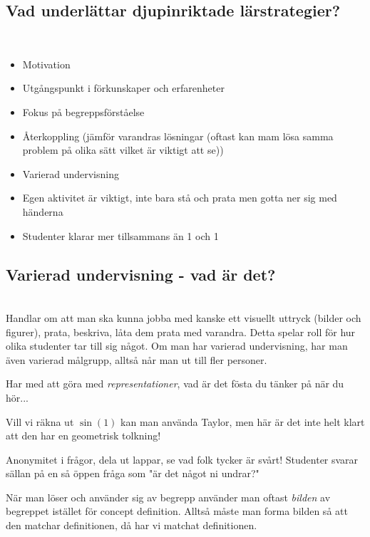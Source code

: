 \subsection{Vad underlättar djupinriktade lärstrategier?}\hfill\\

\begin{itemize}
  \item Motivation
  \item Utgångspunkt i förkunskaper och erfarenheter
  \item Fokus på begreppsförståelse
  \item Återkoppling (jämför varandras lösningar (oftast kan mam lösa samma problem på olika sätt vilket är viktigt att se))
  \item Varierad undervisning
  \item Egen aktivitet är viktigt, inte bara stå och prata men gotta ner sig med händerna
  \item Studenter klarar mer tillsammans än 1 och 1
\end{itemize}

\subsection{Varierad undervisning - vad är det?}\hfill\\

\noindent Handlar om att man ska kunna jobba med kanske ett visuellt uttryck (bilder och figurer), prata, beskriva, låta dem prata med varandra. Detta spelar roll för hur olika studenter tar till sig något. Om man har varierad undervisning, har man även varierad målgrupp, alltså når man ut till fler personer.
\par\bigskip
\noindent Har med att göra med \textit{representationer}, vad är det fösta du tänker på när du hör...
\par\bigskip
\noindent Vill vi räkna ut $\sin(1)$ kan man använda Taylor, men här är det inte helt klart att den har en geometrisk tolkning!
\par\bigskip
\noindent Anonymitet i frågor, dela ut lappar, se vad folk tycker är svårt! Studenter svarar sällan på en så öppen fråga som "är det något ni undrar?"
\par\bigskip
\noindent När man löser och använder sig av begrepp använder man oftast \textit{bilden} av begreppet istället för concept definition. Alltså måste man forma bilden så att den matchar definitionen, då har vi matchat definitionen. 




















